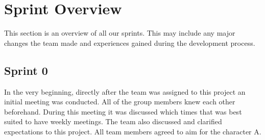 \section{Sprint Overview}
This section is an overview of all our sprints. This may include any major changes the team made and experiences gained during the development process. 

\subsection{Sprint 0}
In the very beginning, directly after the team was assigned to this project an initial meeting was conducted. All of the group members knew each other beforehand. During this meeting it was discussed which times that was best suited to have weekly meetings. The team also discussed and clarified expectations to this project. All team members agreed to aim for the character A.






